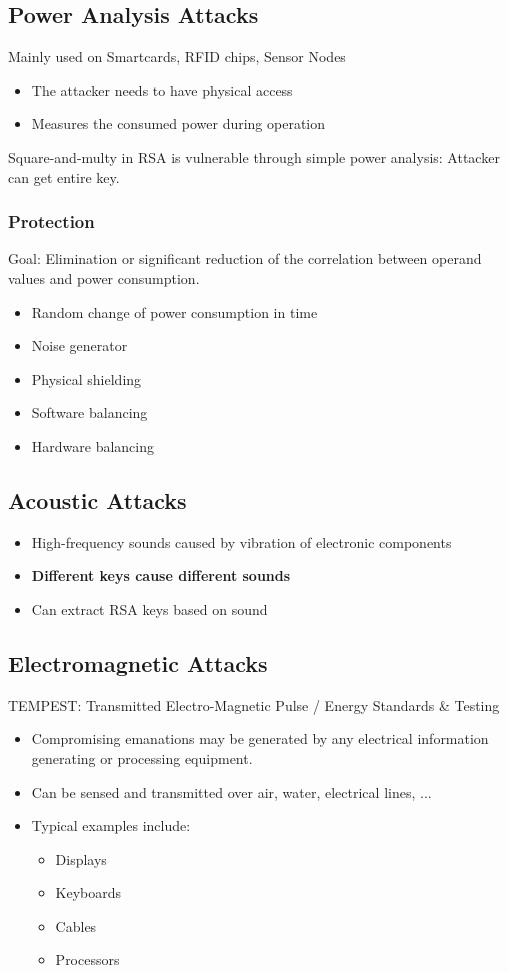 \subsection{Power Analysis Attacks}
Mainly used on Smartcards, RFID chips, Sensor Nodes
\begin{itemize}
  \item The attacker needs to have physical access
  \item Measures the consumed power during  operation
\end{itemize}
Square-and-multy in RSA is vulnerable through simple power analysis: Attacker
can get entire key.
\subsubsection{Protection}
Goal: Elimination or significant reduction of the correlation between operand
values and power consumption.
\begin{itemize}
  \item Random change of power consumption in time
  \item Noise generator
  \item Physical shielding
  \item Software balancing
  \item Hardware balancing
\end{itemize}

\subsection{Acoustic Attacks}
\begin{itemize}
  \item High-frequency sounds caused by vibration of
    electronic components
  \item \textbf{Different keys cause different sounds}
  \item Can extract RSA keys based on sound
\end{itemize}

\subsection{Electromagnetic Attacks}
TEMPEST: Transmitted Electro-Magnetic Pulse / Energy
Standards \& Testing
\begin{itemize}
  \item Compromising emanations may be generated by any electrical information generating or processing equipment.
  \item Can be sensed and transmitted over air, water, electrical lines, ...
  \item Typical examples include:
    \begin{itemize}
      \item Displays
      \item Keyboards
      \item Cables
      \item Processors
    \end{itemize}
\end{itemize}
